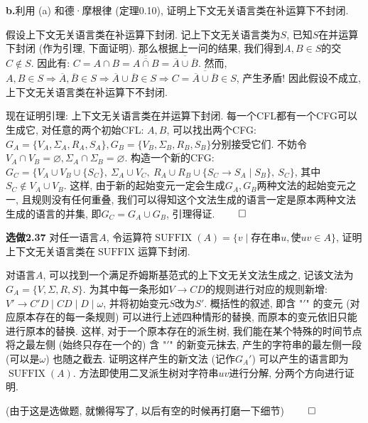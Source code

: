 \documentclass[UTF8]{report}
\newcommand{\problem}[1]{{\setlength{\parskip}{10pt}\noindent \bf{#1}}}
\renewenvironment{proof}{{\setlength{\parskip}{7pt}\noindent\hskip 2em \bf 证明 \quad}}{\hfill$\qed$\par}
\begin{document}
\problem{b.}利用 (a) 和德·摩根律 (定理0.10), 证明上下文无关语言类在补运算下不封闭.

\begin{proof}
    假设上下文无关语言类在补运算下封闭. 记上下文无关语言类为$S$, 已知$S$在并运算下封闭 (作为引理, 下面证明). 那么根据上一问的结果, 我们得到$A,B \in S$的交$C \notin S$. 因此有: $C = A \cap B = \overline{\overline{A \cap B}} = \overline{\overline{A} \cup \overline{B}}$. 然而, 
    $A,B \in S \Longrightarrow \overline{A}, \overline{B} \in S \Longrightarrow \overline{A} \cup \overline{B} \in S \Longrightarrow C = \overline{\overline{A} \cup \overline{B}} \in S$, 产生矛盾! 因此假设不成立, 上下文无关语言类在补运算下不封闭.

    现在证明引理: 上下文无关语言类在并运算下封闭. 每一个CFL都有一个CFG可以生成它, 对任意的两个初始CFL: $A, B$, 可以找出两个CFG: 
    $G_A = \{ V_A, \Sigma_A, R_A, S_A \}, G_B = \{ V_B, \Sigma_B, R_B, S_B \}$分别接受它们. 不妨令$V_A \cap V_B = \varnothing, \Sigma_A \cap \Sigma_B = \varnothing$. 构造一个新的CFG: 
    $G_C = \{ V_A \cup V_B \cup \{S_C\},\ \Sigma_A \cup V_C,\ R_A \cup R_B \cup \{S_C \rightarrow S_A \mid S_B\},\ S_C  \}$, 其中 $S_C \notin V_A \cup V_B$. 这样, 由于新的起始变元一定会生成$G_A,G_B$两种文法的起始变元之一, 且规则没有任何重叠, 我们可以得知这个文法生成的语言一定是原本两种文法生成的语言的并集, 即$G_C = G_A \cup G_B$, 引理得证.
\end{proof}



\problem{选做2.37} 对任一语言$A$, 令运算符$\operatorname*{SUFFIX}(A) = \{ v \mid \text{存在串}u, \text{使} uv\in A \} $, 证明上下文无关语言类在$\operatorname*{SUFFIX}$运算下封闭.

\begin{proof}
    对语言$A$, 可以找到一个满足乔姆斯基范式的上下文无关文法生成之, 记该文法为$G_A = \{ V, \Sigma, R, S \}$. 为其中每一条形如$V \rightarrow CD$的规则进行对应的规则新增: $V' \rightarrow C'D \mid CD \mid D \mid \omega$, 并将初始变元$S$改为$S'$. 概括性的叙述, 即含 "$'$" 的变元 (对应原本存在的每一条规则) 可以进行上述四种情形的替换, 而原本的变元依旧只能进行原本的替换. 这样, 对于一个原本存在的派生树, 我们能在某个特殊的时间节点将之最左侧 (始终只存在一个的) 含 "$'$" 的新变元抹去, 产生的字符串的最左侧一段 (可以是$\omega$) 也随之截去. 证明这样产生的新文法 (记作$G_A'$) 可以产生的语言即为$\operatorname*{SUFFIX}(A)$. 方法即使用二叉派生树对字符串$uv$进行分解, 分两个方向进行证明.

    (由于这是选做题, 就懒得写了, 以后有空的时候再打磨一下细节)
\end{proof}
\end{document}
